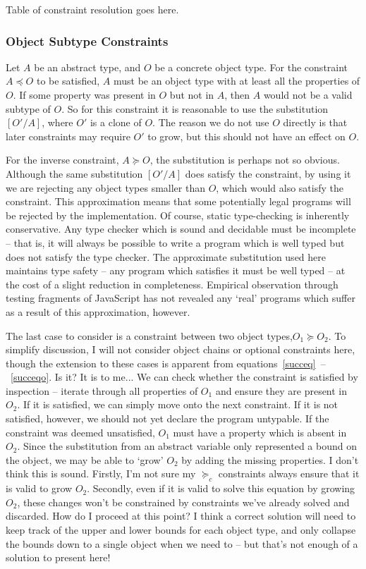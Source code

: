 \documentclass[12pt,a4paper,twoside,openright]{report}
\begin{document}
{\color{red}Table of constraint resolution goes here.}

\subsubsection*{Object Subtype Constraints} 
Let $A$ be an abstract type, and $O$ be a concrete object type. For the
constraint $A \preceq O$ to be satisfied, $A$ must be an object type with at
least all the properties of $O$. If some property was present in $O$ but not in
$A$, then $A$ would not be a valid subtype of $O$. So for this constraint it is
reasonable to use the substitution $[O'/A]$, where $O'$ is a clone of $O$. The
reason we do not use $O$ directly is that later constraints may require $O'$ to
grow, but this should not have an effect on $O$.

For the inverse constraint, $A\succeq O$, the substitution is perhaps not so
obvious. Although the same substitution $[O'/A]$ does satisfy the constraint,
by using it we are rejecting any object types smaller than $O$, which would
also satisfy the constraint. This approximation means that some potentially
legal programs will be rejected by the implementation. Of course, static
type-checking is inherently conservative.  Any type checker which is sound and
decidable must be incomplete -- that is, it will always be possible to write a
program which is well typed but does not satisfy the type checker. The
approximate substitution used here maintains type safety -- any program which
satisfies it must be well typed -- at the cost of a slight reduction in
completeness. Empirical observation through testing fragments of JavaScript has
not revealed any `real' programs which suffer as a result of this
approximation, however.

The last case to consider is a constraint between two object types,$O_1\succeq
O_2$. To simplify discussion, I will not consider object chains or optional
constraints here, though the extension to these cases is apparent from
equations~\ref{succeq}~--~\ref{succeqo}. {\color{red}Is it? It is to me...} We
can check whether the constraint is satisfied by inspection -- iterate through
all properties of $O_1$ and ensure they are present in $O_2$. If it is
satisfied, we can simply move onto the next constraint. If it is not satisfied,
however, we should not yet declare the program untypable. If the constraint was
deemed unsatisfied, $O_1$ must have a property which is absent in $O_2$. Since
the substitution from an abstract variable only represented a bound on the
object, we may be able to `grow' $O_2$ by adding the missing properties.
{\color{red}I don't think this is sound. Firstly, I'm not sure my $\succeq_c$
  constraints always ensure that it is valid to grow $O_2$. Secondly, even if
  it is valid to solve this equation by growing $O_2$, these changes won't be
  constrained by constraints we've already solved and discarded. How do I
  proceed at this point?  I think a correct solution will need to keep track of
  the upper and lower bounds for each object type, and only collapse the bounds
  down to a single object when we need to -- but that's not enough of a
  solution to present here!}
\end{document}

